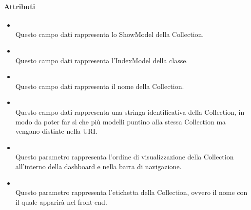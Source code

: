 \paragraph*{Attributi}
\begin{itemize}
\item[]  \\ Questo campo dati rappresenta lo ShowModel della Collection.
\item[]  \\ Questo campo dati rappresenta l'IndexModel della classe.
\item[]  \\ Questo campo dati rappresenta il nome della Collection.
\item[]  \\ Questo campo dati rappresenta una stringa identificativa della Collection, in modo da poter far sì che più modelli puntino alla stessa Collection ma vengano distinte nella URI.
\item[]  \\ Questo parametro rappresenta l'ordine di visualizzazione della Collection all'interno della dashboard e nella barra di navigazione.
\item[]  \\ Questo parametro rappresenta l'etichetta della Collection, ovvero il nome con il quale apparirà nel front-end.
\end{itemize}

